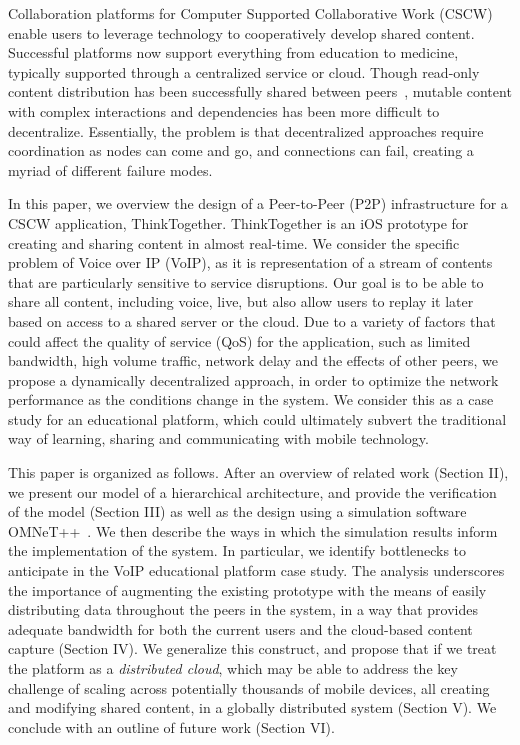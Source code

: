 Collaboration platforms for Computer Supported Collaborative Work (CSCW) enable
users to leverage technology to cooperatively develop shared content.
Successful platforms now support everything from education to medicine,
typically supported through a centralized service or cloud. Though read-only
content distribution has been successfully shared between
peers~\cite{XG_P2P_INFO04}, mutable content with complex interactions and
dependencies
has been more difficult to decentralize. Essentially, the problem is that
decentralized approaches require coordination as nodes can come and go, and
connections can fail, creating a myriad of different failure modes.

In this paper, we overview the design of a Peer-to-Peer (P2P) infrastructure for
a CSCW application, ThinkTogether.  ThinkTogether is an iOS prototype for
creating and sharing content in almost real-time. We consider the specific
problem of Voice over IP (VoIP), as it is representation of a stream of contents
that are particularly sensitive to service disruptions.  Our goal is to be able
to share all content, including voice, live, but also allow users to replay it
later based on access to a shared server or the cloud.  Due to a variety of
factors that could affect the quality of service (QoS) for the application, such
as limited bandwidth, high volume traffic, network delay and the effects of
other peers, we propose a dynamically decentralized approach, in order to
optimize the network performance as the conditions change in the system.  We
consider this as a case study for an educational platform, which could ultimately subvert the
traditional way of learning, sharing and communicating with mobile technology.


This paper is organized as follows.  After an overview of related work (Section
II), we present our model of a hierarchical architecture, and provide the
verification of the model (Section III) as well as the design using a simulation
software OMNeT++~\cite{A_OMNET_ESM01}. We then describe the ways in which
the simulation results inform the implementation of the system.
In particular, we identify bottlenecks to anticipate in the VoIP educational
platform case study. The analysis underscores the importance of augmenting the
existing prototype with the means of easily distributing data throughout the peers
in the system, in a way that provides adequate bandwidth for both the current
users and the cloud-based content capture (Section IV).  We generalize this
construct, and propose that if we treat the platform as a {\em distributed
cloud}, which may be able to address the key challenge of scaling across
potentially thousands of mobile devices, all creating and modifying shared
content, in a globally distributed system (Section V).  We conclude with an
outline of future work (Section VI).

